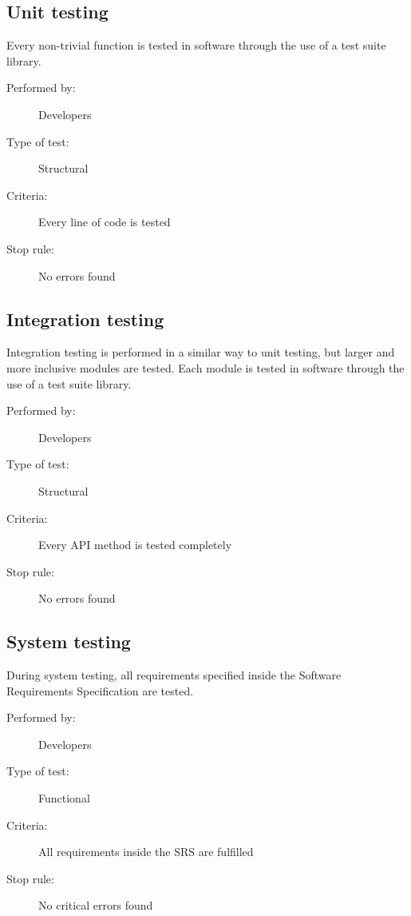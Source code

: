 \documentclass[12pt,titlepage,bibliography=totoc]{article}
\begin{document}
\subsection{Unit testing}
\label{subsec:unit-testing}

Every non-trivial function is tested in software through the use of a test suite
library.

\begin{description}
	\item[Performed by:]	Developers
	\item[Type of test:]	Structural
	\item[Criteria:]	Every line of code is tested
	\item[Stop rule:]	No errors found
\end{description}


\subsection{Integration testing}
\label{subsec:integration-testing}

Integration testing is performed in a similar way to unit testing, but larger
and more inclusive modules are tested. Each module is tested in software through
the use of a test suite library.

\begin{description}
	\item[Performed by:]	Developers
	\item[Type of test:]	Structural
	\item[Criteria:]	Every API method is tested completely
	\item[Stop rule:]	No errors found
\end{description}


\subsection{System testing}
\label{subsec:system-testing}

During system testing, all requirements specified inside the Software
Requirements Specification are tested.

\begin{description}
	\item[Performed by:]	Developers
	\item[Type of test:]	Functional
	\item[Criteria:]	All requirements inside the SRS are fulfilled
	\item[Stop rule:]	No critical errors found
\end{description}
\end{document}
